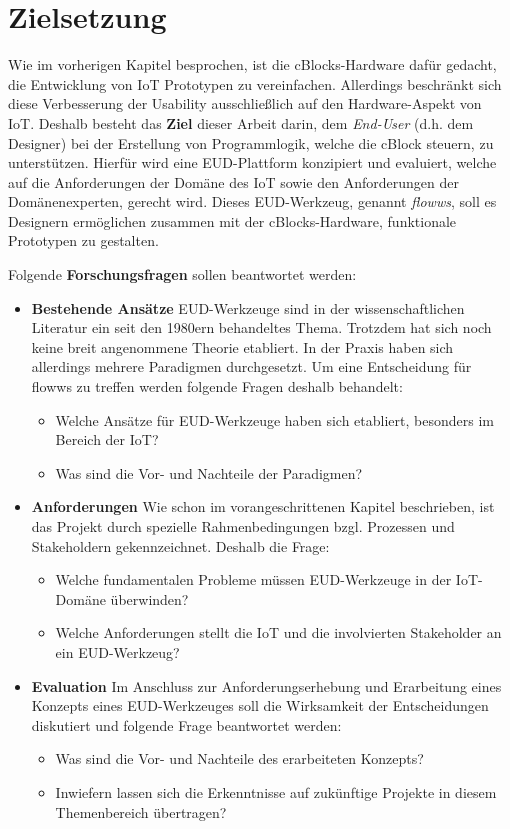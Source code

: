 \section{Zielsetzung}\label{sec:1_zielsetzung}
Wie im vorherigen Kapitel besprochen, ist die \acp{cBlock}-Hardware dafür gedacht, die Entwicklung von \ac{IoT} Prototypen zu vereinfachen. Allerdings beschränkt sich diese Verbesserung der Usability ausschließlich auf den Hardware-Aspekt von \ac{IoT}. Deshalb besteht das \textbf{Ziel} dieser Arbeit darin, dem \textit{End-User} (d.h. dem Designer) bei der Erstellung von Programmlogik, welche die \ac{cBlock} steuern, zu unterstützen. Hierfür wird eine \ac{EUD}-Plattform konzipiert und evaluiert, welche auf die Anforderungen der Domäne des \ac{IoT} sowie den Anforderungen der Domänenexperten, gerecht wird. Dieses \ac{EUD}-Werkzeug, genannt \textit{flowws}, soll es Designern ermöglichen zusammen mit der \acp{cBlock}-Hardware, funktionale Prototypen zu gestalten.

Folgende \textbf{Forschungsfragen} sollen beantwortet werden:
\begin{itemize}
    \item \textbf{Bestehende Ansätze} \ac{EUD}-Werkzeuge sind in der wissenschaftlichen Literatur ein seit den 1980ern behandeltes Thema. Trotzdem hat sich noch keine breit angenommene Theorie etabliert. In der Praxis haben sich allerdings mehrere Paradigmen durchgesetzt. Um eine Entscheidung für flowws zu treffen werden folgende Fragen deshalb behandelt:
    \begin{itemize}
        \item Welche Ansätze für \ac{EUD}-Werkzeuge haben sich etabliert, besonders im Bereich der \ac{IoT}?
        \item Was sind die Vor- und Nachteile der Paradigmen?
    \end{itemize}
    \item \textbf{Anforderungen} Wie schon im vorangeschrittenen Kapitel beschrieben, ist das Projekt durch spezielle Rahmenbedingungen bzgl. Prozessen und Stakeholdern gekennzeichnet. Deshalb die Frage:
    \begin{itemize}
        \item Welche fundamentalen Probleme müssen \ac{EUD}-Werkzeuge in der \ac{IoT}-Domäne überwinden?
        \item Welche Anforderungen stellt die \ac{IoT} und die involvierten Stakeholder an ein \ac{EUD}-Werkzeug?
    \end{itemize}
    \item \textbf{Evaluation} Im Anschluss zur Anforderungserhebung und Erarbeitung eines Konzepts eines \ac{EUD}-Werkzeuges soll die Wirksamkeit der Entscheidungen diskutiert und folgende Frage beantwortet werden: 
    \begin{itemize}
        \item Was sind die Vor- und Nachteile des erarbeiteten Konzepts?
        \item Inwiefern lassen sich die Erkenntnisse auf zukünftige Projekte in diesem Themenbereich übertragen?
    \end{itemize}
\end{itemize}

